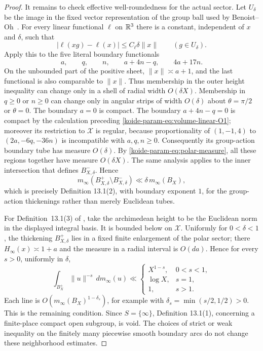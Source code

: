 \begin{proof}
It remains to check effective well-roundedness for the actual sector.
Let $U_\delta$ be the image in the fixed vector representation of the
group ball used by Benoist--Oh~\cite[Definition~13.1]{BenoistOh_2012}.
For every linear functional $\ell$ on
$\mathbb R^3$ there is a constant, independent of $x$ and $\delta$, such that
\begin{equation}
 |\ell(xg)-\ell(x)|\leq C_\ell\delta\|x\|
 \qquad(g\in U_\delta).
 \label{koide-param-eq:linear-functional-motion}
\end{equation}
Apply this to the five literal boundary functionals
\[
 a,\qquad q,\qquad n,\qquad a+4n-q,\qquad4a+17n.
\]
On the unbounded part of the positive sheet, $\|x\|\asymp a+1$, and the
last functional is also comparable to $\|x\|$.  Thus membership in the
outer height inequality can change only in a shell of radial width
$O(\delta X)$.  Membership in $q\geq0$ or $n\geq0$ can change only in
angular strips of width $O(\delta)$ about $\theta=\pi/2$ or $\theta=0$.
The boundary $a=0$ is compact.  The boundary $a+4n-q=0$ is compact by
the calculation preceding \eqref{koide-param-eq:volume-linear-O1}; moreover its
restriction to $\mathscr X$ is regular, because proportionality of
$(1,-1,4)$ to $(2a,-6q,-36n)$ is incompatible with $a,q,n\geq0$.
Consequently its group-action boundary tube has measure $O(\delta)$.
By \eqref{koide-param-eq:polar-measure}, all these regions together have measure
$O(\delta X)$.  The same analysis applies to the inner intersection that
defines $B^-_{X,\delta}$.  Hence
\begin{equation}
 m_\infty(B^+_{X,\delta}\setminus B^-_{X,\delta})
 \ll \delta\,m_\infty(B_X),
 \label{koide-param-eq:BO-boundary-condition}
\end{equation}
which is precisely Definition 13.1(2), with boundary exponent $1$, for
the group-action thickenings rather than merely Euclidean tubes.

For Definition~13.1(3) of \cite{BenoistOh_2012}, take the archimedean height to be the
Euclidean norm in the displayed integral basis.  It is bounded below on
$\mathscr X$.  Uniformly for $0<\delta<1$, the thickening
$B^+_{X,\delta}$ lies in a fixed finite enlargement of the polar sector;
there $H_\infty(x)\asymp1+a$ and the measure in a radial interval is
$O(da)$.  Hence for every $s>0$, uniformly in $\delta$,
\[
 \int_{B_X^+}\|u\|^{-s}\,dm_\infty(u)
 \ll
 \begin{cases}
 X^{1-s},&0<s<1,\\
 \log X,&s=1,\\
 1,&s>1.
 \end{cases}
\]
Each line is $O(m_\infty(B_X)^{1-\delta_s})$, for example with
$\delta_s=\min(s/2,1/2)>0$.  This is the remaining condition.  Since
$S=\{\infty\}$, Definition 13.1(1), concerning a finite-place compact
open subgroup, is void.  The choices of strict
or weak inequality on the finitely many piecewise smooth boundary arcs do
not change these neighborhood estimates.
\end{proof}

